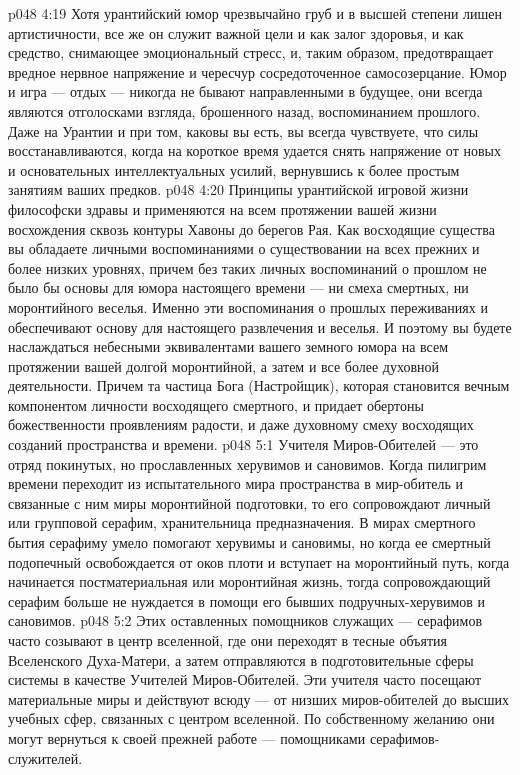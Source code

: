 \vs p048 4:19 \pc Хотя урантийский юмор чрезвычайно груб и в высшей степени лишен артистичности, все же он служит важной цели и как залог здоровья, и как средство, снимающее эмоциональный стресс, и, таким образом, предотвращает вредное нервное напряжение и чересчур сосредоточенное самосозерцание. Юмор и игра --- отдых --- никогда не бывают направленными в будущее, они всегда являются отголосками взгляда, брошенного назад, воспоминанием прошлого. Даже на Урантии и при том, каковы вы есть, вы всегда чувствуете, что силы восстанавливаются, когда на короткое время удается снять напряжение от новых и основательных интеллектуальных усилий, вернувшись к более простым занятиям ваших предков.
\vs p048 4:20 Принципы урантийской игровой жизни философски здравы и применяются на всем протяжении вашей жизни восхождения сквозь контуры Хавоны до берегов Рая. Как восходящие существа вы обладаете личными воспоминаниями о существовании на всех прежних и более низких уровнях, причем без таких личных воспоминаний о прошлом не было бы основы для юмора настоящего времени --- ни смеха смертных, ни моронтийного веселья. Именно эти воспоминания о прошлых переживаниях и обеспечивают основу для настоящего развлечения и веселья. И поэтому вы будете наслаждаться небесными эквивалентами вашего земного юмора на всем протяжении вашей долгой моронтийной, а затем и все более духовной деятельности. Причем та частица Бога (Настройщик), которая становится вечным компонентом личности восходящего смертного, и придает обертоны божественности проявлениям радости, и даже духовному смеху восходящих созданий пространства и времени.
\vs p048 5:1 Учителя Миров\hyp{}Обителей --- это отряд покинутых, но прославленных херувимов и сановимов. Когда пилигрим времени переходит из испытательного мира пространства в мир\hyp{}обитель и связанные с ним миры моронтийной подготовки, то его сопровождают личный или групповой серафим, хранительница предназначения. В мирах смертного бытия серафиму умело помогают херувимы и сановимы, но когда ее смертный подопечный освобождается от оков плоти и вступает на моронтийный путь, когда начинается постматериальная или моронтийная жизнь, тогда сопровождающий серафим больше не нуждается в помощи его бывших подручных\hyp{}херувимов и сановимов.
\vs p048 5:2 Этих оставленных помощников служащих --- серафимов часто созывают в центр вселенной, где они переходят в тесные объятия Вселенского Духа\hyp{}Матери, а затем отправляются в подготовительные сферы системы в качестве Учителей Миров\hyp{}Обителей. Эти учителя часто посещают материальные миры и действуют всюду --- от низших миров\hyp{}обителей до высших учебных сфер, связанных с центром вселенной. По собственному желанию они могут вернуться к своей прежней работе --- помощниками серафимов\hyp{}служителей.
